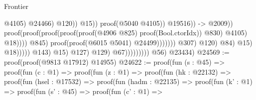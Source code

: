 \begin{lexlean}{Frontier}
\begin{coremodule}
                                                                                                            @4105)
                                                                                                          @24466)
                                                                                                        @120))
                                                                                                  @15))
                                                                                            proof(@5040
                                                                                                @4105))
                                                                                          @19516)) ->
                                                                                      @2009))
                                                                                  proof(proof(proof(proof(proof(@4906
                                                                                              @825)
                                                                                            proof(Bool.ctorIdx))
                                                                                          @830)
                                                                                        @4105)
                                                                                      @18))))
                                                                          @845)
                                                                        proof(proof(@6015 @5041)
                                                                            @24499)))))))
                                                          @307)
                                                        @120)
                                                      @84)
                                                    @15)
                                                  @18)))))
                                      @143)
                                    @15)
                                  @127)
                                @129)
                              @67)))))))))
        @56)
      @23434)
@24569 := proof(proof(@9813 @17912) @14955)
@24622 := proof(fun (s : @45) =>
    proof(fun (c : @1) =>
      proof(fun (z : @1) =>
        proof(fun (hk : @22132) =>
          proof(fun (hsel : @17532) =>
            proof(fun (hadm : @22135) =>
              proof(fun (k' : @1) =>
                proof(fun (s' : @45) =>
                  proof(fun (c' : @1) =>

\end{coremodule}
\end{lexlean}
